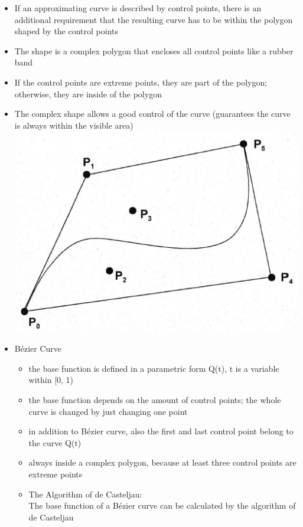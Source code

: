 \documentclass[12pt]{article}
\begin{document}
\begin{itemize}
	\item If an approximating curve is described by control points, there is an additional requirement that the resulting curve has to be within the polygon shaped by the control points
	\item The shape is a complex polygon that encloses all control points like a rubber band
	\item If the control points are extreme points, they are part of the polygon; otherwise, they are inside of the polygon
	\item The complex shape allows a good control of the curve (guarantees the curve is always within the visible area)\\
\includegraphics[scale=0.5]{3_26}
	\item B\'ezier Curve
	\begin{itemize}
		\item the base function is defined in a parametric form Q(t), t is a variable within [0, 1)
		\item the base function depends on the amount of control points; the whole curve is changed by just changing one point
		\item in addition to B\'ezier curve, also the first and last control point belong to the curve Q(t)
		\item always inside a complex polygon, because at least three control points are extreme points
		\item The Algorithm of de Casteljau: \\
		The base function of a B\'ezier curve can be calculated by the algorithm of de Casteljau\\

\end{itemize}
\end{itemize}
\end{document}
